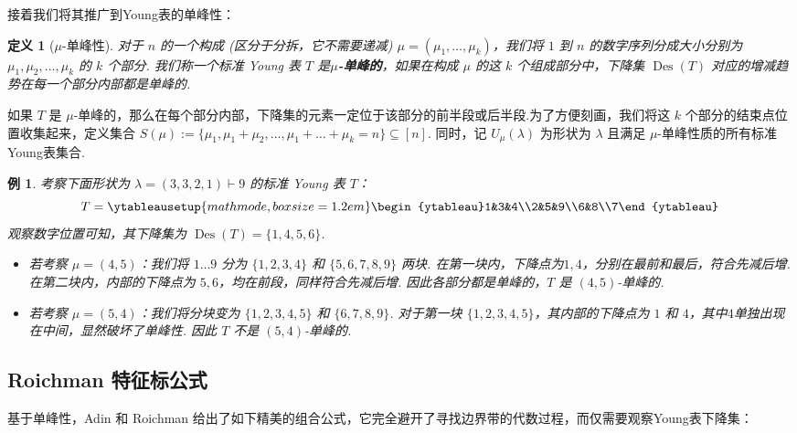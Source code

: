 \documentclass{sjtureport}
\newtheorem{definition}{定义}[chapter]
\newtheorem{example}{例}[chapter]
\begin{document}
接着我们将其推广到Young表的单峰性：
\begin{definition}[$\mu$-单峰性]
    对于 $n$ 的一个构成 (区分于分拆，它不需要递减) $\mu=(\mu_1,\dots,\mu_k)$，我们将 $1$ 到 $n$ 的数字序列分成大小分别为 $\mu_1, \mu_2, \dots, \mu_k$ 的 $k$ 个部分. 我们称一个标准 Young 表 $T$ 是\textbf{$\mu$-单峰的}，如果在构成 $\mu$ 的这 $k$ 个组成部分中，下降集 $\operatorname{Des}(T)$ 对应的增减趋势在每一个部分内部都是单峰的.
\end{definition}
如果 $T$ 是 $\mu$-单峰的，那么在每个部分内部，下降集的元素一定位于该部分的前半段或后半段.为了方便刻画，我们将这 $k$ 个部分的结束点位置收集起来，定义集合 $S(\mu) := \{\mu_1, \mu_1+\mu_2, \dots, \mu_1+\dots+\mu_k=n\} \subseteq [n]$. 同时，记 $U_\mu(\lambda)$ 为形状为 $\lambda$ 且满足 $\mu$-单峰性质的所有标准Young表集合. 

\begin{example}
    考察下面形状为 $\lambda=(3,3,2,1) \vdash 9$ 的标准 Young 表 $T$：
    \begin{equation*}
        T = \ytableausetup{mathmode, boxsize=1.2em}\begin{ytableau}1&3&4\\2&5&9\\6&8\\7\end{ytableau}
    \end{equation*}
    观察数字位置可知，其下降集为 $\operatorname{Des}(T) = \{1, 4, 5, 6\}$. 
    \begin{itemize}
        \item 若考察 $\mu = (4,5)$：我们将 $1 \dots 9$ 分为 $\{1,2,3,4\}$ 和 $\{5,6,7,8,9\}$ 两块. 在第一块内，下降点为$1,4$，分别在最前和最后，符合先减后增.在第二块内，内部的下降点为 $5,6$，均在前段，同样符合先减后增. 因此各部分都是单峰的，$T$ 是 $(4,5)$-单峰的. 
        \item 若考察 $\mu = (5,4)$：我们将分块变为 $\{1,2,3,4,5\}$ 和 $\{6,7,8,9\}$. 对于第一块 $\{1,2,3,4,5\}$，其内部的下降点为 $1$ 和 $4$，其中$4$单独出现在中间，显然破坏了单峰性. 因此 $T$ 不是 $(5,4)$-单峰的. 
    \end{itemize}
\end{example}

\subsection{Roichman 特征标公式}

基于单峰性，Adin 和 Roichman 给出了如下精美的组合公式，它完全避开了寻找边界带的代数过程，而仅需要观察Young表下降集：
\end{document}
